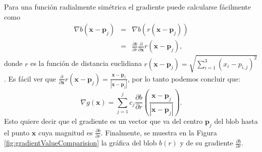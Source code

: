 Para una función radialmente simétrica el gradiente puede calcularse fácilmente como
\begin{eqnarray}
 \nabla b(\textbf{x} - \textbf{p}_j) & = & \nabla b (r (\textbf{x} - \textbf{p}_j)) \\
 \nonumber
	  & = & \frac{\partial b}{\partial r} \frac{\partial}{\partial \textbf{x}} r (\textbf{x} - \textbf{p}_j),
\end{eqnarray}
donde $r$ es la función de distancia euclidiana $r(\textbf{x} - \textbf{p}_j) = \sqrt{ \sum \limits_{i = 1}^{3} (x_i - p_{i,j})^2}$. Es fácil ver que $\frac{\partial}{\partial \textbf{x}} r (\textbf{x} - \textbf{p}_j) = \frac{\textbf{x} - \textbf{p}_j}{|\textbf{x} - \textbf{p}_j|}$, por lo tanto podemos concluir que:
\begin{equation}
 \nabla g(\textbf{x}) = \sum \limits_{j = 1}^{j} c_j \frac{\partial b}{\partial r} \left( \frac{\textbf{x} - \textbf{p}_j}{|\textbf{x} - \textbf{p}_j|} \right).
 \label{ec:gradSuperficie}
\end{equation}
Esto quiere decir que el gradiente es un vector que va del centro $\textbf{p}_j$ del blob hasta el punto $\textbf{x}$ cuya magnitud es $\frac{\partial b}{\partial r}$. Finalmente, se muestra en la Figura \ref{fig:gradientValueComparision} la gráfica del blob $b(r)$ y de su gradiente $\frac{\partial b}{\partial r}$.






